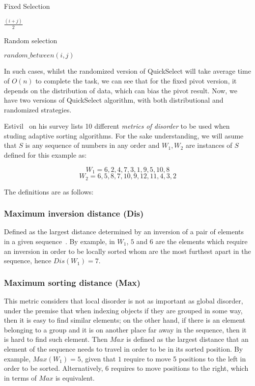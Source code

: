\begin{algorithm}
  \caption{Fixed Selection}\label{ALG:Select_fixed}
  \begin{algorithmic}[1]
    \State \Return $\frac{(i+j)}{2}$
    \EndProcedure
  \end{algorithmic}
\end{algorithm}

\begin{algorithm}
  \caption{Random selection}\label{ALG:Select_random}
  \begin{algorithmic}[1]
    \State \Return $random\_between(i,j)$
    \EndProcedure
  \end{algorithmic}
\end{algorithm}

In such cases, whilst the randomized version of QuickSelect will take average time of $O(n)$ to complete the task, we can see that for the fixed pivot version, it depends on the distribution of data, which can bias the pivot result. Now, we have two versions of QuickSelect algorithm, with both distributional and randomized strategies.

Estivil~\cite{estivil92} on his survey lists 10 different \textit{metrics of disorder} to be used when studing adaptive sorting algorithms. For the sake understanding, we will asume that $S$ is any sequence of numbers in any order and $W_1,W_2$ are instances of $S$ defined for this example as: 

$$W_1 = {6,2,4,7,3,1,9,5,10,8}$$
$$W_2 = {6,5,8,7,10,9,12,11,4,3,2}$$

The definitions are as follows:

\subsubsection{Maximum inversion distance (Dis)}
Defined as the largest distance determined by an inversion of a pair of elements in a given sequence~\cite{Estivill-Castro_Wood_1989}.  By example, in $W_1$,  $5$ and $6$ are the elements which require an inversion in order to be locally sorted whom are the most furthest apart in the sequence, hence $Dis(W_1) = 7$.

\subsubsection{Maximum sorting distance (Max)}
This metric considers that local disorder is not as important as global disorder, under the premise that when indexing objects if they are grouped in some way, then it is easy to find similar elements; on the other hand, if there is an element belonging to a group and it is on another place far away in the sequence, then it is hard to find such element. Then $Max$ is defined as the largest distance that an element of the sequence needs to travel in order to be in its sorted position\cite{Estivill-Castro_Wood_1989}. By example, $Max(W_1) = 5$, given that $1$ require to move 5 positions to the left in order to be sorted. Alternatively, $6$ requires to move positions to the right, which in terms of $Max$ is equivalent.

